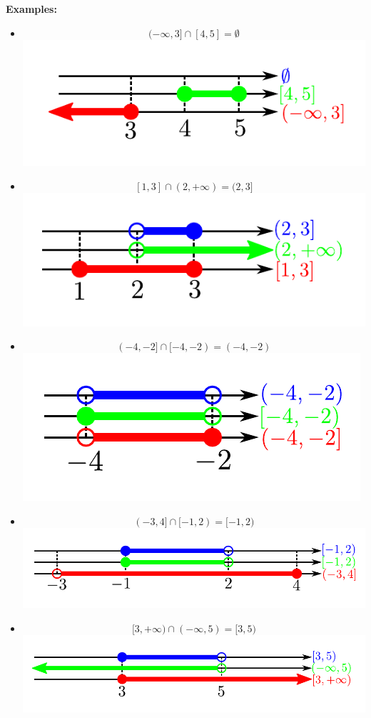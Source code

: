 \documentclass{article}
\begin{document}
\textbf{Examples:}
\begin{itemize}
\item 
\[(-\infty, 3] \cap [4, 5] = \emptyset\]
\includegraphics[scale = 0.9]{intersection_example_1}
\item 
\[[1, 3] \cap (2, +\infty) = (2, 3]\]
\includegraphics[scale = 0.9]{intersection_example_2}
\item 
\[(-4, -2] \cap [-4, -2) = (-4, -2)\]
\includegraphics[scale = 0.9]{intersection_example_3}
\item 
\[(-3, 4] \cap [-1, 2) = [-1, 2)\]
\includegraphics[scale = 0.9]{intersection_example_4}
\item 
\[[3, +\infty) \cap (-\infty, 5) = [3, 5)\]
\includegraphics[scale = 0.9]{intersection_example_5}
\end{itemize}
\end{document}

